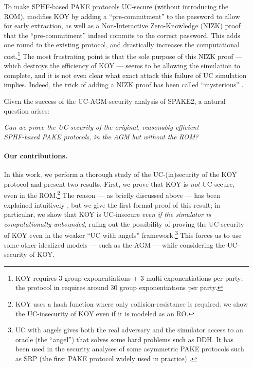 \begin{enumerate}
      To make SPHF-based PAKE protocols UC-secure (without introducing the ROM), \cite{EC:CHKLM05} modifies KOY by adding a ``pre-commitment'' to the password to allow for early extraction, as well as a Non-Interactive Zero-Knowledge (NIZK) proof that the ``pre-commitment'' indeed commits to the correct password. This adds one round to the existing protocol, and drastically increases the computational cost.\footnote{KOY requires 3 group exponentiations + 3 multi-exponentiations per party; the protocol in \cite{EC:CHKLM05} requires around 30 group exponentiations per party.} The most frustrating point is that the sole purpose of this NIZK proof --- which destroys the efficiency of KOY --- seems to be allowing the simulation to complete, and it is not even clear what exact attack this failure of UC simulation implies. Indeed, the trick of adding a NIZK proof has been called ``mysterious'' \cite[Section~10.5]{pake-sok}.
\end{enumerate}
Given the success of the UC-AGM-security analysis of SPAKE2, a natural question arises:
\begin{displayquote}
\begin{center}
  \emph{Can we prove the UC-security of the original, reasonably efficient \\ SPHF-based PAKE protocols, in the AGM but without the ROM?}
\end{center}
\end{displayquote}

\paragraph{Our contributions.}
In this work, we perform a thorough study of the UC-(in)security of the KOY protocol and present two results. First, we prove that KOY is \emph{not} UC-secure, even in the ROM.\footnote{KOY uses a hash function where only collision-resistance is required; we show the UC-insecurity of KOY even if it is modeled as an RO.} The reason  --- as briefly discussed above --- has been explained intuitively \cite[Section~3.3]{EC:CHKLM05}, but we give the first formal proof of this result; in particular, we show that KOY is UC-insecure \emph{even if the simulator is computationally unbounded}, ruling out the possibility of proving the UC-security of KOY even in the weaker ``UC with angels'' framework.\footnote{UC with angels \cite{STOC:PraSah04} gives both the real adversary and the simulator access to an oracle (the ``angel'') that solves some hard problems such as DDH. It has been used in the security analyses of some asymmetric PAKE protocols such as SRP (the first PAKE protocol widely used in practice) \cite{CSF:DayLeh24}.} This forces us to use some other idealized models --- such as the AGM --- while considering the UC-security of KOY.

